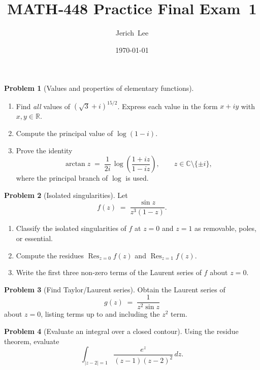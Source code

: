 \documentclass[12pt]{article}
\title{MATH‑448 Practice Final Exam 1}
\author{Jerich Lee}
\date{\today}
\theoremstyle{definition}
\newtheorem{problem}{Problem}
\begin{document}
\maketitle
\pagebreak

\begin{problem}[Values and properties of elementary functions]
\begin{enumerate}[label=(\alph*),itemsep=6pt]
  \item Find \emph{all} values of \((\sqrt{3}+i)^{15/2}\).  Express each value in the form \(x+iy\) with \(x,y\in\mathbb{R}\).
  \item Compute the principal value of \(\displaystyle \log(1-i)\).
  \item Prove the identity
        \[
          \arctan z \;=\; \frac{1}{2i}\,
          \log\!\left(\frac{1+iz}{1-iz}\right),
          \qquad z\in\mathbb{C}\setminus\{\pm i\},
        \]
        where the principal branch of \(\log\) is used.
\end{enumerate}
\end{problem}
\pagebreak
\begin{problem}[Isolated singularities]
Let
\[
  f(z)\;=\;\frac{\sin z}{z^{3}(1-z)}.
\]
\begin{enumerate}[label=(\alph*),itemsep=6pt]
  \item Classify the isolated singularities of \(f\) at \(z=0\) and \(z=1\) as removable, poles, or essential.
  \item Compute the residues \(\operatorname*{Res}_{z=0}f(z)\) and \(\operatorname*{Res}_{z=1}f(z)\).
  \item Write the first three non‑zero terms of the Laurent series of \(f\) about \(z=0\).
\end{enumerate}
\end{problem}
\pagebreak
\begin{problem}[Find Taylor/Laurent series]
Obtain the Laurent series of
\[
  g(z)\;=\;\frac{1}{z^{2}\sin z}
\]
about \(z=0\), listing terms up to and including the \(z^{2}\) term.
\end{problem}
\pagebreak
\begin{problem}[Evaluate an integral over a closed contour]
Using the residue theorem, evaluate
\[
  \int_{\lvert z-2\rvert = 1}
  \frac{e^{z}}{(z-1)(z-2)^{2}}\,dz.
\]
\end{problem}
\end{document}

